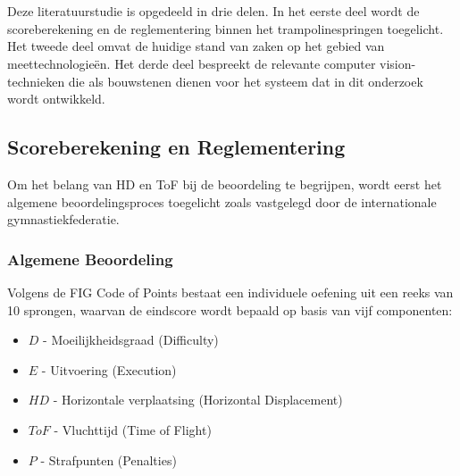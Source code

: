 \chapter{}%
\label{ch:stand-van-zaken}



Deze literatuurstudie is opgedeeld in drie delen. In het eerste deel wordt de scoreberekening en de reglementering binnen het trampolinespringen toegelicht. Het tweede deel omvat de huidige stand van zaken op het gebied van meettechnologie{\"e}n. Het derde deel bespreekt de relevante computer vision-technieken die als bouwstenen dienen voor het systeem dat in dit onderzoek wordt ontwikkeld.

\section{Scoreberekening en Reglementering}
\label{sec:scoreberekening}

Om het belang van HD en ToF bij de beoordeling te begrijpen, wordt eerst het algemene beoordelingsproces toegelicht zoals vastgelegd door de internationale gymnastiekfederatie.

\subsection{Algemene Beoordeling}
Volgens de FIG Code of Points \parencite{FTTC2024} bestaat een individuele oefening uit een reeks van 10 sprongen, waarvan de eindscore wordt bepaald op basis van vijf componenten:

\begin{itemize}
    \item $D$ - Moeilijkheidsgraad (Difficulty)
    \item $E$ - Uitvoering (Execution)
    \item $HD$ - Horizontale verplaatsing (Horizontal Displacement)
    \item $ToF$ - Vluchttijd (Time of Flight)
    \item $P$ - Strafpunten (Penalties)
\end{itemize}

